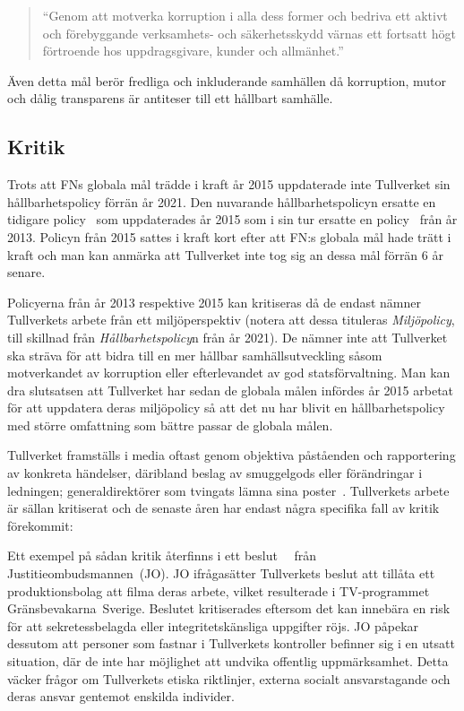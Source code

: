 \begin{quotation}
    ``Genom att motverka korruption i alla dess former och bedriva ett aktivt
    och förebyggande verksamhets- och säkerhetsskydd värnas ett fortsatt högt
    förtroende hos uppdragsgivare, kunder och allmänhet.''
\end{quotation}

Även detta mål berör fredliga och inkluderande samhällen då korruption, mutor
och dålig transparens är antiteser till ett hållbart samhälle.

\subsection{Kritik}

Trots att FNs globala mål trädde i kraft år 2015 uppdaterade inte Tullverket
sin hållbarhetspolicy förrän år 2021. Den nuvarande hållbarhetspolicyn ersatte
en tidigare policy~\cite{policy2015} som uppdaterades år 2015 som i sin tur
ersatte en policy~\cite{policy2013} från år 2013. Policyn från 2015 sattes i
kraft kort efter att FN:s globala mål hade trätt i kraft och man kan anmärka
att Tullverket inte tog sig an dessa mål förrän 6 år senare. 

Policyerna från år 2013 respektive 2015 kan kritiseras då de endast nämner
Tullverkets arbete från ett miljöperspektiv (notera att dessa tituleras
\emph{Miljöpolicy}, till skillnad från \emph{Hållbarhetspolicy}n från år 2021).
De nämner inte att Tullverket ska sträva för att bidra till en mer hållbar
samhällsutveckling såsom motverkandet av korruption eller efterlevandet av god
statsförvaltning.
%
Man kan dra slutsatsen att Tullverket har sedan de globala målen infördes år
2015 arbetat för att uppdatera deras miljöpolicy så att det nu har blivit en
hållbarhetspolicy med större omfattning som bättre passar de globala målen.

Tullverket framställs i media oftast genom objektiva påståenden och
rapportering av konkreta händelser, däribland beslag av smuggelgods eller
förändringar i ledningen; generaldirektörer som tvingats lämna sina
poster~\cite{dn-gd}. Tullverkets arbete är sällan kritiserat och de senaste
åren har endast några specifika fall av kritik förekommit:

Ett exempel på sådan kritik återfinns i ett
beslut~\cite{dj-jo}~\cite{jo-uttalande} från Justitieombudsmannen~(JO). JO
ifrågasätter Tullverkets beslut att tillåta ett produktionsbolag att filma
deras arbete, vilket resulterade i TV-programmet Gränsbevakarna~Sverige.
Beslutet kritiserades eftersom det kan innebära en risk för att
sekretessbelagda eller integritetskänsliga uppgifter röjs. JO påpekar dessutom
att personer som fastnar i Tullverkets kontroller befinner sig i en utsatt
situation, där de inte har möjlighet att undvika offentlig uppmärksamhet. Detta
väcker frågor om Tullverkets etiska riktlinjer, externa socialt ansvarstagande
och deras ansvar gentemot enskilda individer. 

